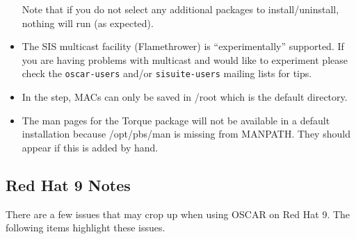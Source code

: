 \begin{itemize}
  Note that if you do not select any additional packages to
  install/uninstall, nothing will run (as expected).

\item The SIS multicast facility (Flamethrower) is ``experimentally''
  supported.  If you are having problems with multicast and would like
  to experiment please check the {\tt oscar-users} and/or
  {\tt sisuite-users} mailing lists for tips.

\begchange
\item In the  step, MACs can
  only be saved in /root which is the default directory.

\item The man pages for the Torque package will not be available in
  a default installation because /opt/pbs/man is missing from
  MANPATH.  They should appear if this is added by hand.
\endchange


\end{itemize}


\subsection{Red Hat 9 Notes}
\label{subsec:rh90notes}

There are a few issues that may crop up when using OSCAR on Red Hat 9.
The following items highlight these issues.

